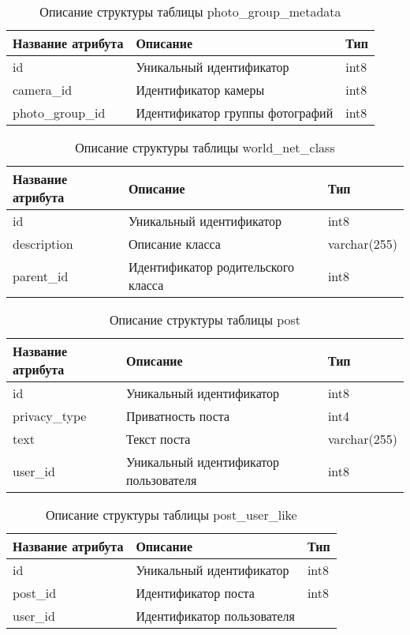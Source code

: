 \begin{table}[H]
  \caption{\onehalfspacing Описание структуры таблицы photo_group_metadata}\label{database-table-photo-group-metadata}
  \begin{tabular}{|p{6cm}|p{6cm}|p{4cm}|}
  \hline Название атрибута & Описание & Тип \\
  \hline id & Уникальный идентификатор & int8 \\
  \hline camera_id & Идентификатор камеры & int8 \\
  \hline photo_group_id & Идентификатор группы фотографий & int8 \\
  \hline
  \end{tabular}
\end{table}

\begin{table}[H]
  \caption{\onehalfspacing Описание структуры таблицы world_net_class}\label{database-table-world-net-class}
  \begin{tabular}{|p{6cm}|p{6cm}|p{4cm}|}
  \hline Название атрибута & Описание & Тип \\
  \hline id & Уникальный идентификатор & int8 \\
  \hline description & Описание класса & varchar(255) \\
  \hline parent_id & Идентификатор родительского класса & int8 \\
  \hline 
  \end{tabular}
\end{table}

\begin{table}[H]
  \caption{\onehalfspacing Описание структуры таблицы post}\label{database-table-post}
  \begin{tabular}{|p{6cm}|p{6cm}|p{4cm}|}
  \hline Название атрибута & Описание & Тип \\
  \hline id & Уникальный идентификатор & int8 \\
  \hline privacy_type & Приватность поста & int4 \\
  \hline text & Текст поста & varchar(255) \\
  \hline user_id & Уникальный идентификатор пользователя & int8 \\
  \hline 
  \end{tabular}
\end{table}

\begin{table}[H]
  \caption{\onehalfspacing Описание структуры таблицы post_user_like}\label{database-table-post-user-like}
  \begin{tabular}{|p{6cm}|p{6cm}|p{4cm}|}
  \hline Название атрибута & Описание & Тип \\
  \hline id & Уникальный идентификатор & int8 \\
  \hline post_id & Идентификатор поста & int8 \\
  \hline user_id & Идентификатор пользователя\\
  \hline 
  \end{tabular}
\end{table}


